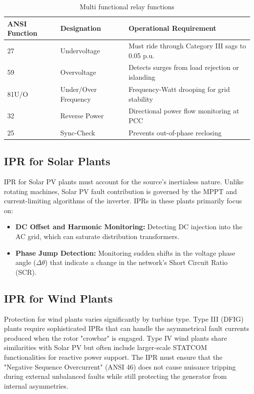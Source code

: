 \begin{table}[h!]
    \centering
    \caption{Multi functional relay functions}
    \label{tab:placeholder_label}
    \begin{tabular}{lll}
        \toprule
        ANSI Function & Designation & Operational Requirement \\
        \midrule
        27    & Undervoltage         & Must ride through Category III sags to 0.05 p.u. \\
        59    & Overvoltage          & Detects surges from load rejection or islanding \\
        81U/O & Under/Over Frequency & Frequency-Watt drooping for grid stability \\
        32    & Reverse Power        & Directional power flow monitoring at PCC \\
        25    & Sync-Check           & Prevents out-of-phase reclosing \\
        \bottomrule
    \end{tabular}
\end{table}
\subsection{IPR for Solar Plants}
IPR for Solar PV plants must account for the source's inertialess nature. Unlike rotating machines, Solar PV fault contribution is governed by the MPPT and current-limiting algorithms of the inverter. IPRs in these plants primarily focus on:
\begin{itemize}
    \item \textbf{DC Offset and Harmonic Monitoring:} Detecting DC injection into the AC grid, which can saturate distribution transformers.
    \item \textbf{Phase Jump Detection:} Monitoring sudden shifts in the voltage phase angle ($\Delta\theta$) that indicate a change in the network's Short Circuit Ratio (SCR).
\end{itemize}

\subsection{IPR for Wind Plants}
Protection for wind plants varies significantly by turbine type. Type III (DFIG) plants require sophisticated IPRs that can handle the asymmetrical fault currents produced when the rotor "crowbar" is engaged. Type IV wind plants share similarities with Solar PV but often include larger-scale STATCOM functionalities for reactive power support. The IPR must ensure that the "Negative Sequence Overcurrent" (ANSI 46) does not cause nuisance tripping during external unbalanced faults while still protecting the generator from internal asymmetries.

